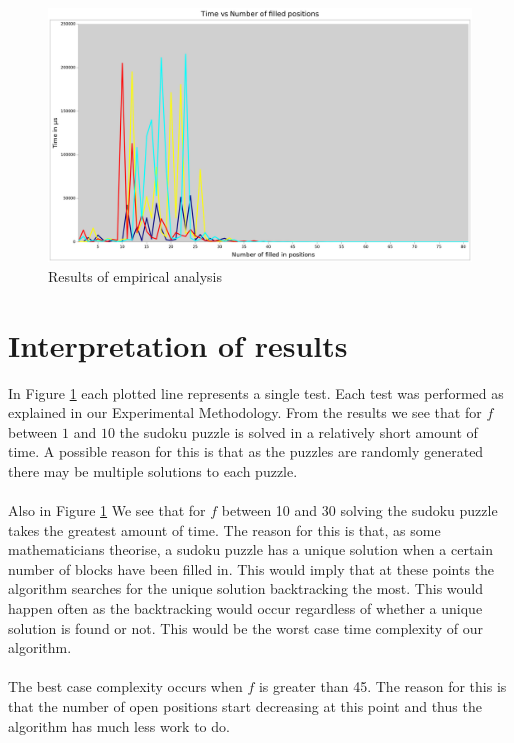 \documentclass[12pt,a4paper,titlepage]{article}
\begin{document}
\begin{figure}[H]
\centering
\includegraphics[width = \textwidth]{graph1}
\caption{Results of empirical analysis}
\label{fig:graph1}
\end{figure}

\section{Interpretation of results}

In Figure \ref{fig:graph1} each plotted line represents a single test. Each test was performed as explained in our Experimental Methodology. From the results we see that for $f$ between $1$ and $10$ the sudoku puzzle is solved in a relatively short amount of time. A possible reason for this is that as the puzzles are randomly generated there may be multiple solutions to each puzzle.
\\
\\
Also in Figure \ref{fig:graph1} We see that for $f$ between 10 and 30 solving the sudoku puzzle takes the greatest amount of time. The reason for this is that, as some mathematicians theorise, a sudoku puzzle has a unique solution when a certain number of blocks have been filled in. This would imply that at these points the algorithm searches for the unique solution backtracking the most. This would happen often as the backtracking would occur regardless of whether a unique solution is found or not. This would be the worst case time complexity of our algorithm. 
\\
\\
The best case complexity occurs when $f$ is greater than 45. The reason for this is that the number of open positions start decreasing at this point and thus the algorithm has much less work to do.    
\end{document}

